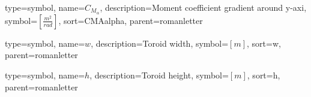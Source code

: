 {
	type=symbol, %
	name={\ensuremath{C_{M_\alpha}}}, %
	description={Moment coefficient gradient around y-axi}, %
	symbol={$\left[\frac{m^2}{rad}\right]$}, %
	sort=CMAalpha, %
	parent=romanletter %
}

{
	type=symbol, %
	name={\ensuremath{w}}, %
	description={Toroid width}, %
	symbol={$\left[m\right]$}, %
	sort=w, %
	parent=romanletter %
}

{
	type=symbol, %
	name={\ensuremath{h}}, %
	description={Toroid height}, %
	symbol={$\left[m\right]$}, %
	sort=h, %
	parent=romanletter %
}
